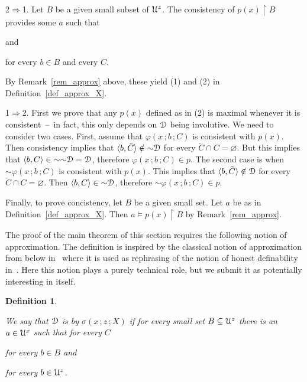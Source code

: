 \documentclass{amsproc}
\makeatletter
\newcounter{thm}
\theoremstyle{mio}
\newtheorem{definition}[thm]{Definition}\tcolorboxenvironment{definition}{mythm}
\providecommand{\proofNameStyle}{\bfseries}
\renewenvironment{proof}[1][\proofname]{\par
  \pushQED{\qed}%
  \normalfont%
  \trivlist
  \item[\hskip\labelsep
        \proofNameStyle
    #1\@addpunct{.}]\ignorespaces
}{%
  \popQED\endtrivlist\@endpefalse
}
\renewcommand*{\emph}[1]{%
   \smash{\tikz[baseline]\node[rectangle, fill=teal!25, rounded corners, inner xsep=0.5ex, inner ysep=0.2ex, anchor=base, minimum height = 2.7ex]{\strut #1};}}
\makeatother
\begin{document}
\begin{proof}

  2$\Rightarrow$1.
  Let $B$ be a given small subset of ${\EuScript U}^z$.
  The consistency of $p(x)\restriction B$ provides some $a$ such that

  \quad and 
  
  \hfill for every $b\in B$ and every $C$. 

  By Remark~\ref{rem_approx} above, these yield (1) and (2) in Definition~\ref{def_approx_X}.
  
  1$\Rightarrow$2.
  First we prove that any $p(x)$ defined as in (2) is maximal whenever it is consistent~--~in fact, this only depends on ${\EuScript D}$ being involutive.
  We need to consider two cases.
  First, assume that $\varphi(x\,;b\,;C)$ is consistent with $p(x)$.
  Then consistency implies that $\langle b,\tilde C\rangle\notin{\sim}{\EuScript D}$ for every $\tilde C\cap C=\varnothing$.
  But this implies that $\langle b, C\rangle\in{\sim}{\sim}{\EuScript D}={\EuScript D}$, therefore $\varphi(x\,;b\,;C)\in p$.
  The second case is when ${\sim}\varphi(x\,;b\,;C)$ is consistent with $p(x)$.
  This implies that $\langle b,\tilde C\rangle\notin{\EuScript D}$ for every $\tilde C\cap C=\varnothing$.
  Then $\langle b,C\rangle\in{\sim}{\EuScript D}$, therefore ${\sim}\varphi(x\,;b\,;C)\in p$.

  Finally, to prove concistency, let $B$ be a given small set.
  Let $a$ be as in Definition~\ref{def_approx_X}.
  Then $a\models p(x)\restriction B$ by Remark~\ref{rem_approx}.
\end{proof}

The proof of the main theorem of this section requires the following notion of approximation.
The definition is inspired by the classical notion of approximation from below in~\cite{Z15} where it is used as rephrasing of the notion of honest definability in~\cite{CS}.
Here this notion plays a purely technical role, but we submit it as potentially interesting in itself.

\begin{definition}\label{def_approx_blw}\strut
  We say that ${\EuScript D}$ is \emph{approximable\/} by $\sigma(x\,;z\,;X)$ \emph{from below\/} if for every small set $B\subseteq{\EuScript U}^z$ there is an $a\in{\EuScript U}^x$ such that for every $C$\smallskip

  \hfill for every $b\in B$ and\smallskip

  \hfill for every $b\in{\EuScript U}^z$.\smallskip
\end{definition}
\end{document}

